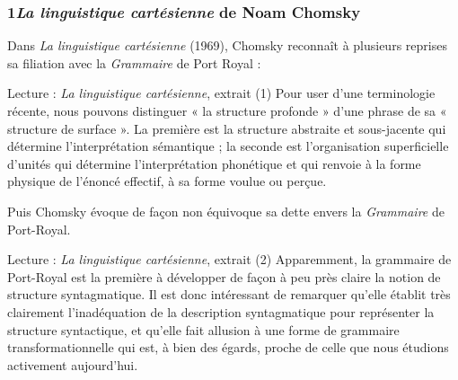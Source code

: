 \subsubsection*{1\quad \textit{La linguistique cartésienne} de Noam Chomsky}
Dans \textit{La linguistique cartésienne} (1969), Chomsky reconnaît à plusieurs reprises sa filiation avec la \textit{Grammaire} de Port Royal :
\begin{lecture}{Lecture : \textit{La linguistique cartésienne}, extrait (1)}
Pour user d’une terminologie récente, nous pouvons distinguer « la structure profonde » d’une phrase de sa « structure de surface ». La première est la structure abstraite et sous-jacente qui détermine l’interprétation sémantique ; la seconde est l’organisation superficielle d’unités qui détermine l’interprétation phonétique et qui renvoie à la forme physique de l’énoncé effectif, à sa forme voulue ou perçue.
\end{lecture}
Puis Chomsky évoque de façon non équivoque sa dette envers la \textit{Grammaire} de Port-Royal.
\begin{lecture}{Lecture : \textit{La linguistique cartésienne}, extrait (2)}
Apparemment, la grammaire de Port-Royal est la première à développer de façon à peu près claire la notion de structure syntagmatique. Il est donc intéressant de remarquer qu’elle établit très clairement l’inadéquation de la description syntagmatique pour représenter la structure syntactique, et qu’elle fait allusion à une forme de grammaire transformationnelle qui est, à bien des égards, proche de celle que nous étudions activement aujourd’hui.
\end{lecture}
